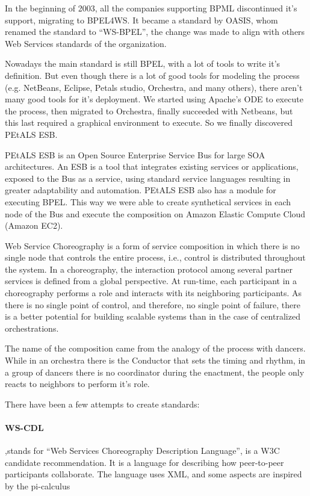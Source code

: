 In the beginning of 2003, all the companies supporting BPML discontinued it's support, migrating to BPEL4WS. It became a standard by OASIS, whom renamed the standard to ``WS-BPEL'', the change was made to align with others Web Services standards of the organization. \citep{OASIS}

Nowadays the main standard is still BPEL, with a lot of tools to write it's definition. But even though there is a lot of good tools for modeling the process (e.g. NetBeans, Eclipse, Petals studio, Orchestra, and many others), there aren't many good tools for it's deployment. We started using Apache's ODE to execute the process, then migrated to Orchestra, finally succeeded with Netbeans, but this last required a graphical environment to execute. So we finally discovered PEtALS ESB. 

PEtALS ESB is an Open Source Enterprise Service Bus for large SOA architectures. \citep{PEtALS} An ESB is a tool that integrates existing services or applications, exposed to the Bus as a service, using standard service languages resulting in greater adaptability and automation. PEtALS ESB also has a module for executing BPEL. This way we were able to create synthetical services in each node of the Bus and execute the composition on Amazon Elastic Compute Cloud (Amazon EC2).


Web Service Choreography is a form of service composition in which there is no single node that controls the entire process, i.e., control is distributed throughout the system. In a choreography, the interaction protocol among several partner services is defined from a global perspective. At run-time, each participant in a choreography performs a role and interacts with its neighboring participants. As there is no single point of control, and therefore, no single point of failure, there is a better potential for building scalable systems than in the case of centralized orchestrations.

The name of the composition came from the analogy of the process with dancers. While in an orchestra there is the Conductor that sets the timing and rhythm, in a group of dancers there is no coordinator during the enactment, the people only reacts to neighbors to perform it's role.

There have been a few attempts to create standards:

\paragraph{WS-CDL}
,stands for ``Web Services Choreography Description Language'', is a W3C candidate recommendation. It is a language for describing how peer-to-peer participants collaborate. The language uses XML, and some aspects are inspired by the pi-calculus

